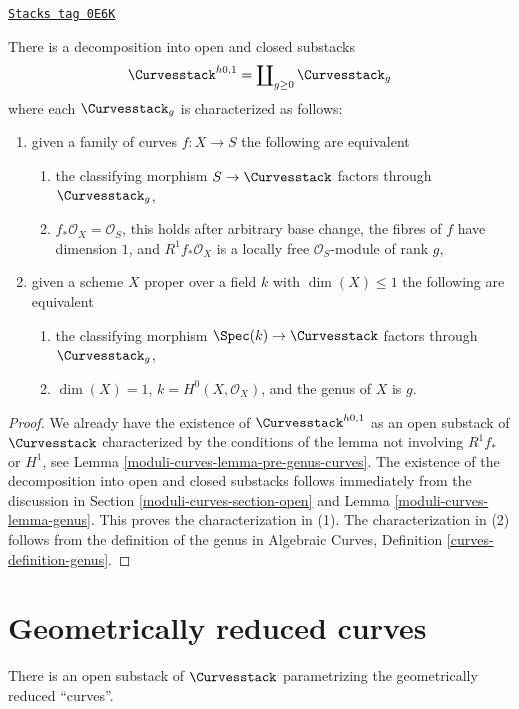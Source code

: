 \begin{lemma}
\label{moduli-curves-lemma-pre-genus-one-piece-per-genus}
\href{https://stacks.math.columbia.edu/tag/0E6K}{\texttt{Stacks tag 0E6K}}

There is a decomposition into open and closed substacks
$$
\Curvesstack^{h0, 1} = \coprod\nolimits_{g \geq 0} \Curvesstack_g
$$
where each $\Curvesstack_g$ is characterized as follows:
\begin{enumerate}
\item given a family of curves $f : X \to S$ the following are equivalent
\begin{enumerate}
\item the classifying morphism $S \to \Curvesstack$ factors
through $\Curvesstack_g$,
\item $f_*\mathcal{O}_X = \mathcal{O}_S$, this holds after
arbitrary base change, the fibres of $f$ have dimension $1$, and
$R^1f_*\mathcal{O}_X$ is a locally free $\mathcal{O}_S$-module of rank $g$,
\end{enumerate}
\item given a scheme $X$ proper over a field $k$ with $\dim(X) \leq 1$
the following are equivalent
\begin{enumerate}
\item the classifying morphism $\Spec(k) \to \Curvesstack$ factors
through $\Curvesstack_g$,
\item $\dim(X) = 1$, $k = H^0(X, \mathcal{O}_X)$, and
the genus of $X$ is $g$.
\end{enumerate}
\end{enumerate}
\end{lemma}

\begin{proof}
We already have the existence of $\Curvesstack^{h0, 1}$ as an open
substack of $\Curvesstack$ characterized by the conditions of the
lemma not involving $R^1f_*$ or $H^1$, see Lemma \ref{moduli-curves-lemma-pre-genus-curves}.
The existence of the decomposition into open and closed substacks
follows immediately from the discussion in Section \ref{moduli-curves-section-open}
and Lemma \ref{moduli-curves-lemma-genus}. This proves the characterization in (1).
The characterization in (2) follows from the definition of the
genus in Algebraic Curves, Definition \ref{curves-definition-genus}.
\end{proof}

\section{Geometrically reduced curves}
\label{moduli-curves-section-geometrically-reduced}
There is an open substack of $\Curvesstack$ parametrizing
the geometrically reduced ``curves''.

